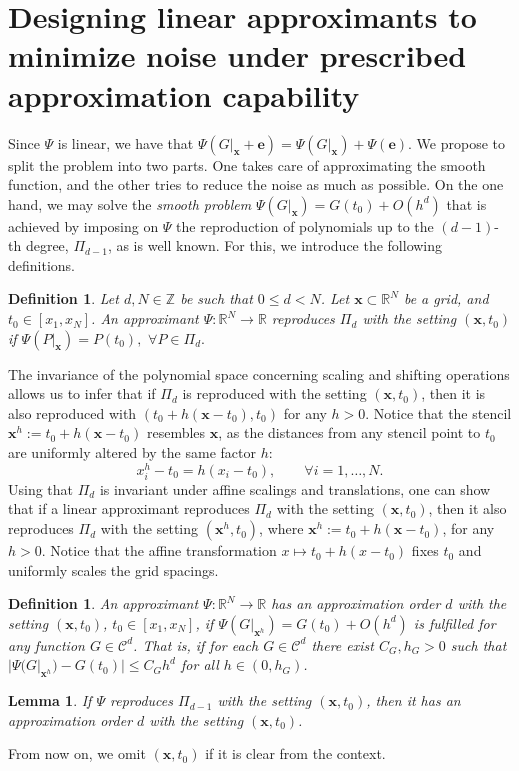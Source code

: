 \documentclass[preprint]{elsarticle}       %
\newcommand{\R}{\mathds{R}}
\newcommand{\Z}{\mathds{Z}}
\newcommand{\lra}{\longrightarrow}
\newcommand{\be}{\bm{e}}
\newcommand{\bx}{\bm{x}}
\theoremstyle{plain}
\newtheorem{lem}[thm]{Lemma}
\newtheorem{defi}[thm]{Definition}
\theoremstyle{remark}
\begin{document}
\section{Designing linear approximants to minimize noise under prescribed approximation capability}\label{linearcase}

Since $\Psi$ is linear, we have that $ \Psi(G|_{\bx}+\be) = \Psi (G|_{\bx}) + \Psi (\be)$. We propose to split the problem into two parts. One takes care of approximating the smooth function, and the other tries to reduce the noise as much as possible.
On the one hand, we may solve the \emph{smooth problem}
$\Psi (G|_{\bx}) = G(t_0) + O(h^d)$
that is achieved by imposing on $\Psi$ the reproduction of polynomials up to the $(d-1)$-th degree, $\Pi_{d-1}$, as is well known. For this, we introduce the following definitions.
\begin{defi}
    Let $d,N\in\Z$ be such that $0\leq d < N$. Let $\bx\subset\R^N$ be a grid, and $t_0\in[x_1,x_N]$.
	An approximant $\Psi:\R^N\lra\R$ reproduces $\Pi_{d}$ with the setting $(\bx, t_0)$ if $\Psi (P|_{\bx}) = P(t_0), \,\, \forall P\in \Pi_{d}.$
\end{defi}
The invariance of the polynomial space concerning scaling and shifting operations allows us to infer that if $\Pi_{d}$ is reproduced with the setting $(\bx, t_0)$, then it is also reproduced with $(t_0 + h (\bx-t_0), t_0)$ for any $h > 0$. Notice that the stencil $\bx^h := t_0 + h (\bx-t_0)$ resembles $\bx$, as the distances from any stencil point to $t_0$ are uniformly altered by the same factor $h$:
\[
    x^h_i - t_0 = h(x_i-t_0), \qquad \forall i=1,\ldots, N.
\]
Using that $\Pi_d$ is invariant under affine scalings and translations, one can show that if a linear approximant reproduces $\Pi_{d}$ with the setting $(\bx, t_0)$, then it also reproduces $\Pi_{d}$ with the setting $(\bx^h, t_0)$, where $\bx^h := t_0 + h (\bx-t_0)$, for any $h > 0$. Notice that the affine transformation $x \mapsto t_0 + h (x-t_0)$ fixes $t_0$ and uniformly scales the grid spacings.

\begin{defi}
	An approximant $\Psi:\R^N\lra\R$ has an approximation order $d$ with the setting $(\bx, t_0)$, $t_0\in[x_1,x_N]$, if $\Psi (G|_{\bx^h}) = G(t_0) + O(h^d)$ is fulfilled for any function $G\in \mathcal{C}^d$. That is, if for each $G\in \mathcal{C}^d$ there exist $C_G,h_G>0$ such that $|\Psi (G|_{\bx^h}) - G(t_0)| \leq C_G h^d$ for all $h\in(0,h_G)$.
\end{defi}
\begin{lem}
	If $\Psi$ reproduces $\Pi_{d-1}$ with the setting $(\bx, t_0)$, then it has an approximation order $d$ with the setting $(\bx, t_0)$.
\end{lem}
From now on, we omit $(\bx, t_0)$ if it is clear from the context.
\end{document}
